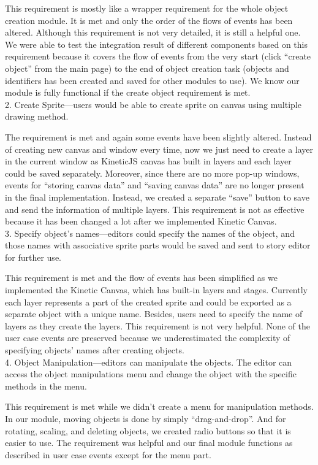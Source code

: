 \documentclass[a4paper, 11pt]{article} %
\begin{document}
This requirement is mostly like a wrapper requirement for the whole object creation module. It is met and only the order of the flows of events has been altered. Although this requirement is not very detailed, it is still a helpful one. We were able to test the integration result of different components based on this requirement because it covers the flow of events from the very start (click “create object” from the main page) to the end of object creation task (objects and identifiers has been created and saved for other modules to use). We know our module is fully functional if the create object requirement is met.\\

2.	Create Sprite—users would be able to create sprite on canvas using multiple drawing method. 

The requirement is met and again some events have been slightly altered. Instead of creating new canvas and window every time, now we just need to create a layer in the current window as KineticJS canvas has built in layers and each layer could be saved separately. Moreover, since there are no more pop-up windows, events for “storing canvas data” and “saving canvas data” are no longer present in the final implementation. Instead, we created a separate “save” button to save and send the information of multiple layers. This requirement is not as effective because it has been changed a lot after we implemented Kinetic Canvas. \\

3.	Specify object’s names—editors could specify the names of the object, and those names with associative sprite parts would be saved and sent to story editor for further use.

This requirement is met and the flow of events has been simplified as we implemented the Kinetic Canvas, which has built-in layers and stages. Currently each layer represents a part of the created sprite and could be exported as a separate object with a unique name. Besides, users need to specify the name of layers as they create the layers. This requirement is not very helpful. None of the user case events are preserved because we underestimated the complexity of specifying objects’ names after creating objects.\\

4.	Object Manipulation—editors can manipulate the objects. The editor can access the object manipulations menu and change the object with the specific methods in the menu.

This requirement is met while we didn’t create a menu for manipulation methods. In our module, moving objects is done by simply “drag-and-drop”. And for rotating, scaling, and deleting objects, we created radio buttons so that it is easier to use. The requirement was helpful and our final module functions as described in user case events except for the menu part.\\
\end{document}
